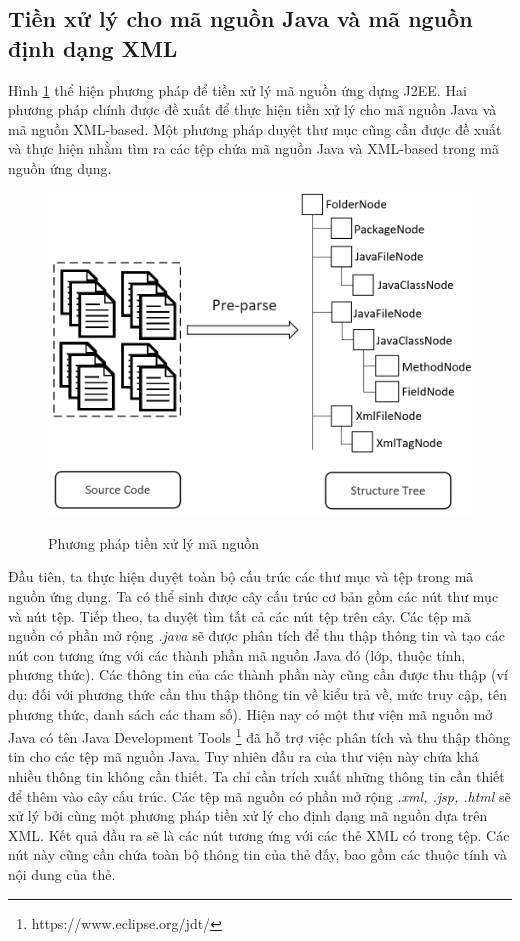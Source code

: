 \documentclass[12pt]{report}
\begin{document}
\subsection{Tiền xử lý cho mã nguồn Java và mã nguồn định dạng XML}
Hình \ref{fig:preprocess} thể hiện phương pháp để tiền xử lý mã nguồn ứng dựng J2EE. Hai phương pháp chính được đề xuất để thực hiện tiền xử lý cho mã nguồn Java và mã nguồn XML-based. Một phương pháp duyệt thư mục cũng cần được đề xuất và thực hiện nhằm tìm ra các tệp chứa mã nguồn Java và XML-based trong mã nguồn ứng dụng.\\

\begin{figure}[h]
	\centering
	\includegraphics[scale=0.7]{preprocess}
	\label{fig:preprocess}
	\caption{Phương pháp tiền xử lý mã nguồn}
\end{figure}

Đầu tiên, ta thực hiện duyệt toàn bộ cấu trúc các thư mục và tệp trong mã nguồn ứng dụng. Ta có thể sinh được cây cấu trúc cơ bản gồm các nút thư mục và nút tệp. Tiếp theo, ta duyệt tìm tất cả các nút tệp trên cây. Các tệp mã nguồn có phần mở rộng \textit{.java} sẽ được phân tích  để thu thập thông tin và tạo các nút con tương ứng với các thành phần mã nguồn Java đó (lớp, thuộc tính, phương thức). Các thông tin của các thành phần này cũng cần được thu thập (ví dụ: đối với phương thức cần thu thập thông tin về kiểu trả về, mức truy cập, tên phương thức, danh sách các tham số). Hiện nay có một thư viện mã nguồn mở Java có tên Java Development Tools \footnote{https://www.eclipse.org/jdt/} đã hỗ trợ việc phân tích và thu thập thông tin cho các tệp mã nguồn Java. Tuy nhiên đầu ra của thư viện này chứa khá nhiều thông tin không cần thiết. Ta chỉ cần trích xuất những thông tin cần thiết để thêm vào cây cấu trúc. Các tệp mã nguồn có phần mở rộng \textit{.xml, .jsp, .html} sẽ xử lý bởi cùng một phương pháp tiền xử lý cho định dạng mã nguồn dựa trên XML. Kết quả đầu ra sẽ là các nút tương ứng với các thẻ XML có trong tệp. Các nút này cũng cần chứa toàn bộ thông tin của thẻ đấy, bao gồm các thuộc tính và nội dung của thẻ.\\
\end{document}
